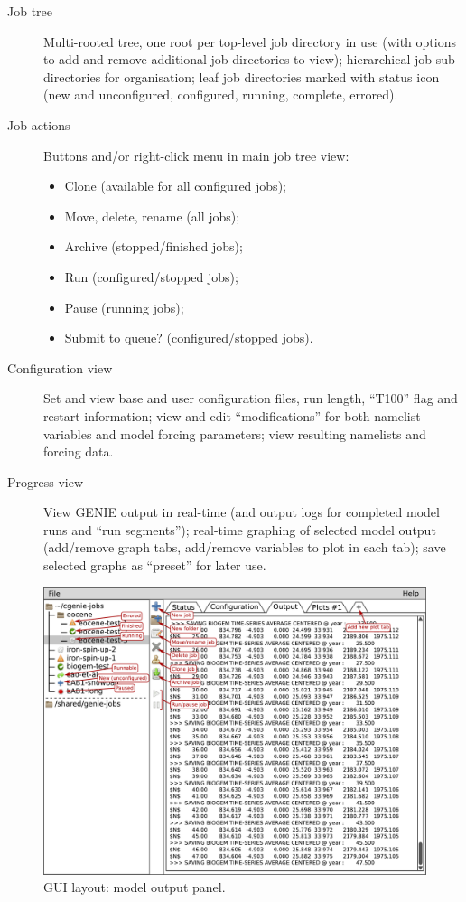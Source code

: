 \documentclass[a4paper,11pt,article]{memoir}
\begin{document}
\begin{description}
  \item[Job tree]{Multi-rooted tree, one root per top-level job
    directory in use (with options to add and remove additional job
    directories to view); hierarchical job sub-directories for
    organisation; leaf job directories marked with status icon (new
    and unconfigured, configured, running, complete, errored).}
  \item[Job actions]{Buttons and/or right-click menu in main job tree
    view:
    \begin{itemize}
      \item{Clone (available for all configured jobs);}
      \item{Move, delete, rename (all jobs);}
      \item{Archive (stopped/finished jobs);}
      \item{Run (configured/stopped jobs);}
      \item{Pause (running jobs);}
      \item{Submit to queue? (configured/stopped jobs).}
  \end{itemize}}
  \item[Configuration view]{Set and view base and user configuration
    files, run length, ``T100'' flag and restart information; view and
    edit ``modifications'' for both namelist variables and model
    forcing parameters; view resulting namelists and forcing data.}
  \item[Progress view]{View GENIE output in real-time (and output logs
    for completed model runs and ``run segments''); real-time graphing
    of selected model output (add/remove graph tabs, add/remove
    variables to plot in each tab); save selected graphs as ``preset''
    for later use.}
\end{description}

\begin{figure}
  \begin{center}
    \includegraphics[width=\textwidth]{gui-view-output}
  \end{center}
  \caption{GUI layout: model output panel.}
  \label{fig:gui-view-output}
\end{figure}
\end{document}
